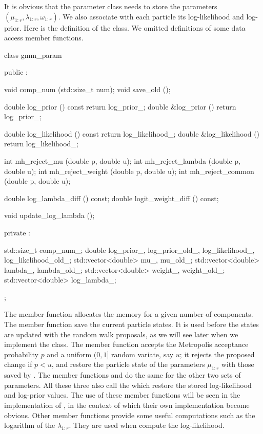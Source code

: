 \documentclass[11pt, fontset=Minion, showoverfull,
bib, mintcode, minted=cache]{marticle}
\begin{document}
It is obvious that the parameter class  needs to store
the parameters $(\mu_{1:r},\lambda_{1:r},\omega_{1:r})$. We also associate
with each particle its log-likelihood and log-prior. Here is the definition of
the  class. We omitted definitions of some data access
member functions.
\begin{cppcode}
class gmm_param
{
    public :

    void comp_num (std::size_t num);
    void save_old ();

    double log_prior () const {return log_prior_;}
    double &log_prior () {return log_prior_;}

    double log_likelihood () const {return log_likelihood_;}
    double &log_likelihood () {return log_likelihood_;}

    int mh_reject_mu (double p, double u);
    int mh_reject_lambda (double p, double u);
    int mh_reject_weight (double p, double u);
    int mh_reject_common (double p, double u);

    double log_lambda_diff () const;
    double logit_weight_diff () const;

    void update_log_lambda ();

    private :

    std::size_t comp_num_;
    double log_prior_, log_prior_old_, log_likelihood_, log_likelihood_old_;
    std::vector<double> mu_, mu_old_;
    std::vector<double> lambda_, lambda_old_;
    std::vector<double> weight_, weight_old_;
    std::vector<double> log_lambda_;
};
\end{cppcode}
The  member function allocates the memory for a given
number of components. The  member function save the
current particle states. It is used before the states are updated with the
random walk proposals, as we will see later when we implement the
 class. The  member function
accepts the Metropolis acceptance probability $p$ and a uniform $(0,1]$ random
variate, say $u$; it rejects the proposed change if $p < u$, and restore the
particle state of the parameters $\mu_{1:r}$ with those saved by
. The member functions  and
 do the same for the other two sets of parameters.
All these three also call the  which restore the
stored log-likelihood and log-prior values. The use of these member functions
will be seen in the implementation of , in the context
of which their own implementation become obvious. Other member functions
provide some useful computations such as the logarithm of the $\lambda_{1:r}$.
They are used when compute the log-likelihood.
\end{document}
